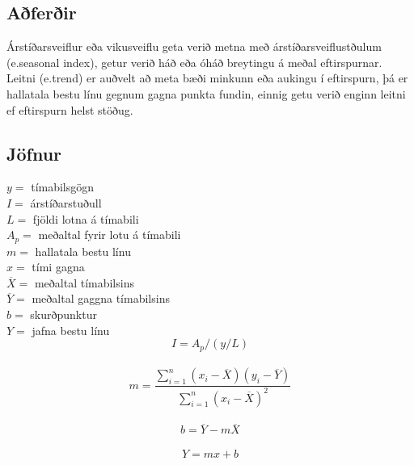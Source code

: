 \subsection{Aðferðir}
Árstíðarsveiflur eða vikusveiflu geta verið metna með árstíðarsveiflustðulum (e.seasonal index), getur verið háð eða óháð breytingu á meðal eftirspurnar. Leitni (e.trend) er auðvelt að meta bæði minkunn eða aukingu í eftirspurn, þá er hallatala bestu línu gegnum gagna punkta fundin, einnig getu verið enginn leitni ef eftirspurn helst stöðug.\cite{TrendLine}


\subsection{Jöfnur}

	$y=$ tímabilsgögn \\
	$I=$ árstíðarstuðull \\
	$L=$ fjöldi lotna á tímabili \\
	$A_p=$ meðaltal fyrir lotu á tímabili \\
	$m=$ hallatala bestu línu \\
	$x=$ tími gagna \\
	$\overline{X} = $ meðaltal tímabilsins \\
	$\overline{Y}= $ meðaltal gaggna tímabilsins \\
	$ b= $ skurðpunktur \\
	$ Y= $ jafna bestu línu \\

	$$ I=  A_p/(y/L) $$ \\
	$$ m= \frac{\sum_{i=1}^{n} (x_{i}-\overline{X})(y_{i}-\overline{Y})}{\sum_{i=1}^{n} (x_{i}-\overline{X})^{2}} $$ \\	
	$$ b=  \overline {Y} -m\overline{X} $$ \\
	$$ Y=  mx+b $$ \\

%